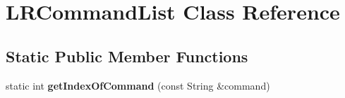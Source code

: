 \hypertarget{class_l_r_command_list}{}\section{L\+R\+Command\+List Class Reference}
\label{class_l_r_command_list}
\subsection*{Static Public Member Functions}
\begin{DoxyCompactItemize}
\item 
static int {\bfseries get\+Index\+Of\+Command} (const String \&command)\hypertarget{class_l_r_command_list_a37b96dd77211ce8f85b2d83beb6d6a51}{}\label{class_l_r_command_list_a37b96dd77211ce8f85b2d83beb6d6a51}

\end{DoxyCompactItemize}
